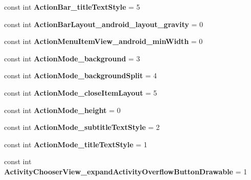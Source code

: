 \begin{DoxyCompactItemize}
const int {\bfseries Action\+Bar\+\_\+title\+Text\+Style} = 5
\item 
\mbox{\label{classXaria_1_1Resource_1_1Styleable_ac3246d355c6764d58363dc3bc1a43d27}} 
const int {\bfseries Action\+Bar\+Layout\+\_\+android\+\_\+layout\+\_\+gravity} = 0
\item 
\mbox{\label{classXaria_1_1Resource_1_1Styleable_a8dacc6c6d48334699de12538614fdeea}} 
const int {\bfseries Action\+Menu\+Item\+View\+\_\+android\+\_\+min\+Width} = 0
\item 
\mbox{\label{classXaria_1_1Resource_1_1Styleable_a4b17446a59307b98d901d00fdd3ea8fd}} 
const int {\bfseries Action\+Mode\+\_\+background} = 3
\item 
\mbox{\label{classXaria_1_1Resource_1_1Styleable_aee1968e14008b3d89f6c2031cfcec647}} 
const int {\bfseries Action\+Mode\+\_\+background\+Split} = 4
\item 
\mbox{\label{classXaria_1_1Resource_1_1Styleable_a84b867995c1e0b4ed191472413deb2a7}} 
const int {\bfseries Action\+Mode\+\_\+close\+Item\+Layout} = 5
\item 
\mbox{\label{classXaria_1_1Resource_1_1Styleable_ae0c9968ffb66ffeca800a46b66d93a6a}} 
const int {\bfseries Action\+Mode\+\_\+height} = 0
\item 
\mbox{\label{classXaria_1_1Resource_1_1Styleable_a6f1201acb4be8b32c32b1bfad4be10ad}} 
const int {\bfseries Action\+Mode\+\_\+subtitle\+Text\+Style} = 2
\item 
\mbox{\label{classXaria_1_1Resource_1_1Styleable_aa2aef941cae4171c70f1760da1f71ff3}} 
const int {\bfseries Action\+Mode\+\_\+title\+Text\+Style} = 1
\item 
\mbox{\label{classXaria_1_1Resource_1_1Styleable_a435f3f608beb7f2e1623fda219627bb3}} 
const int {\bfseries Activity\+Chooser\+View\+\_\+expand\+Activity\+Overflow\+Button\+Drawable} = 1

\end{DoxyCompactItemize}
